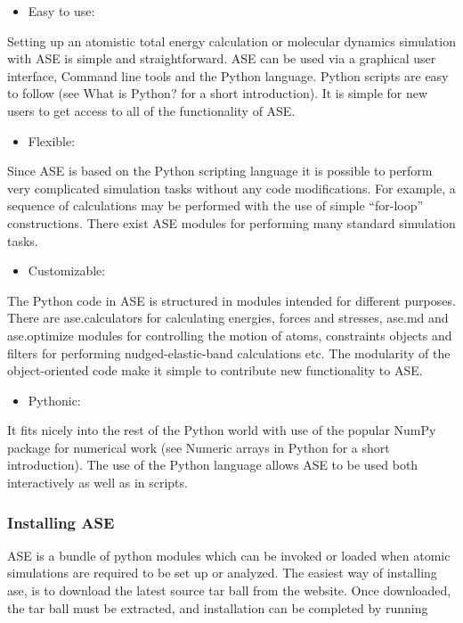 \documentclass[11pt]{article}
\begin{document}
\begin{itemize}
\item Easy to use:
\end{itemize}
Setting up an atomistic total energy calculation or molecular dynamics simulation with ASE is simple and straightforward. ASE can be used via a graphical user interface, Command line tools and the Python language. Python scripts are easy to follow (see What is Python? for a short introduction). It is simple for new users to get access to all of the functionality of ASE.

\begin{itemize}
\item Flexible:
\end{itemize}
Since ASE is based on the Python scripting language it is possible to perform very complicated simulation tasks without any code modifications. For example, a sequence of calculations may be performed with the use of simple “for-loop” constructions. There exist ASE modules for performing many standard simulation tasks.

\begin{itemize}
\item Customizable:
\end{itemize}
The Python code in ASE is structured in modules intended for different purposes. There are ase.calculators for calculating energies, forces and stresses, ase.md and ase.optimize modules for controlling the motion of atoms, constraints objects and filters for performing nudged-elastic-band calculations etc. The modularity of the object-oriented code make it simple to contribute new functionality to ASE.

\begin{itemize}
\item Pythonic:
\end{itemize}
It fits nicely into the rest of the Python world with use of the popular NumPy package for numerical work (see Numeric arrays in Python for a short introduction). The use of the Python language allows ASE to be used both interactively as well as in scripts.

\subsubsection{Installing ASE}
\label{sec-2-3-1}
ASE is a bundle of python modules which can be invoked or loaded when atomic simulations are required to be set up or analyzed. The easiest way of installing ase, is to download the latest source tar ball from the website. Once downloaded, the tar ball must be extracted, and installation can be completed by running 
\end{document}
